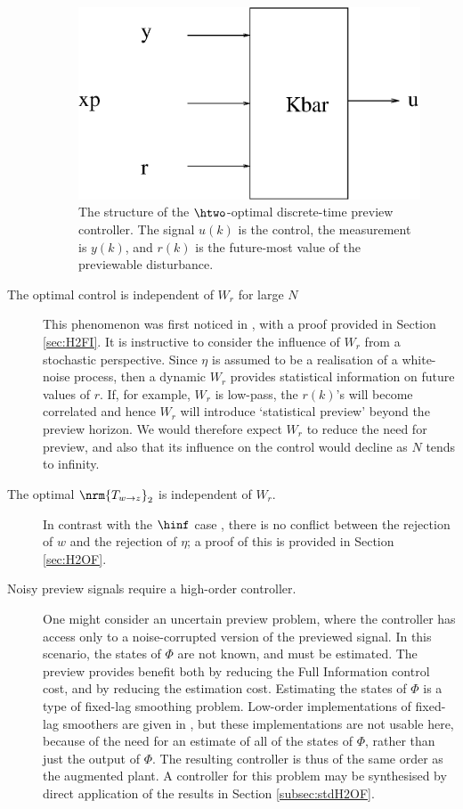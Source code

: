 \begin{description}
{
\stdcontrolfrags
{}
\begin{figure}
\begin{center}
\includegraphics[width=0.5\columnwidth]{./diags/PrevContStructxpKbar.eps}
\caption{\label{fig:PrevContStructxp} The structure of the $\htwo$-optimal discrete-time preview controller. The signal $u(k)$ is the control, the measurement is $y(k)$, and $r(k)$ is the future-most value of the previewable disturbance.}
\end{center}
\end{figure}}
\item[The optimal control is independent of $W_r$ for large $N$]
This phenomenon was first noticed in \cite{Tomizuka_1975_OptDiscretePreview}, with a proof provided in Section \ref{sec:H2FI}. It is instructive to consider the influence of $W_r$ from a stochastic perspective. Since $\eta$ is assumed to be a realisation of a white-noise process, then a dynamic $W_r$ provides statistical information on future values of $r$. If, for example, $W_r$ is low-pass, the $r(k)$'s will become correlated and hence $W_r$ will introduce `statistical preview' beyond the preview horizon. We would therefore expect $W_r$ to reduce the need for preview, and also that its influence on the control would decline as $N$ tends to infinity.
\item[The optimal $\nrm{T_{w\rightarrow z}}_2$ is independent of $W_r$.]
In contrast with the $\hinf$ case \cite{Hazell_2007_DiscreteHinfPreview}, there is no conflict between the rejection of $w$ and the rejection of $\eta$; a proof of this is provided in Section \ref{sec:H2OF}.
\item[Noisy preview signals require a high-order controller.]
One might consider an uncertain preview problem, where the controller has access only to a noise-corrupted version of the previewed signal. 
In this scenario, the states of $\Phi$ are not known, and must be estimated. The preview provides benefit both by reducing the Full Information control cost, and by reducing the estimation cost. Estimating the states of $\Phi$ is a type of fixed-lag smoothing problem. Low-order implementations of fixed-lag smoothers are given in \cite{Anderson_1979_OptimalFiltering}, but these implementations are not usable here, because of the need for an estimate of all of the states of $\Phi$, rather than just the output of $\Phi$. The resulting controller is thus of the same order as the augmented plant. A controller for this problem may be synthesised by direct application of the results in Section \ref{subsec:stdH2OF}.
\end{description}

